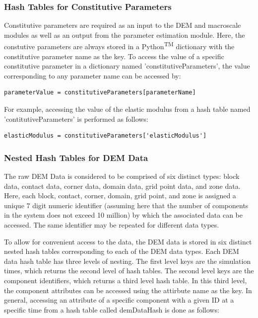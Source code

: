 \subsubsection*{Hash Tables for Constitutive Parameters}

Constitutive parameters are required as an input to the DEM and macroscale modules as well as an output from the parameter estimation module. Here, the constutive parameters are always stored in a Python\textsuperscript{TM} dictionary with the constitutive parameter name as the key. To access the value of a specific constitutive parameter in a dictionary named 'constitutiveParameters', the value corresponding to any parameter name can be accessed by:

\begin{lstlisting}[frame=single]
parameterValue = constitutiveParameters[parameterName]
\end{lstlisting}

For example, accessing the value of the elastic modulus from a hash table named 'contitutiveParameters' is performed as follows:

\begin{lstlisting}[frame=single]
elasticModulus = constitutiveParameters['elasticModulus']
\end{lstlisting}

\subsubsection*{Nested Hash Tables for DEM Data}
The raw DEM Data is considered to be comprised of six distinct types: block data, contact data, corner data, domain data, grid point data, and zone data. Here, each block, contact, corner, domain, grid point, and zone is assigned a unique 7 digit numeric identifier (assuming here that the number of components in the system does not exceed 10 million) by which the associated data can be accessed. The same identifier may be repeated for different data types.

To allow for convenient access to the data, the DEM data is stored in six distinct nested hash tables corresponding to each of the DEM data types.  Each DEM data hash table has three levels of nesting. The first level keys are the simulation times, which returns the second level of hash tables. The second level keys are the component identifiers, which returns a third level hash table. In this third level, the component attributes can be accessed using the attirbute name as the key. In general, accessing an attribute of a specific component with a given ID at a specific time from a hash table called demDataHash is done as follows:


